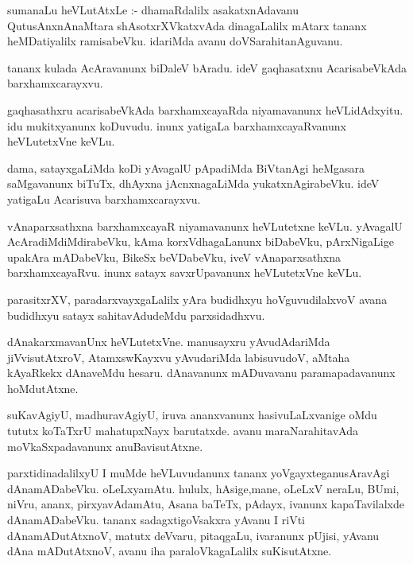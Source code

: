 \documentclass{article}
\begin{document}
\begin{mn}
sumanaLu heVLutAtxLe :- dhamaRdalilx asakatxnAdavanu QutusAnxnAnaMtara  
shAsotxrXVkatxvAda dinagaLalilx mAtarx tananx heMDatiyalilx ramisabeVku. 
idariMda avanu doVSarahitanAguvanu.
\end{mn}

\begin{mn}
tananx kulada AcAravanunx biDaleV bAradu. ideV gaqhasatxnu AcarisabeVkAda barxhamxcarayxvu.
\end{mn}

\begin{mn}
gaqhasathxru acarisabeVkAda barxhamxcayaRda niyamavanunx heVLidAdxyitu. idu
mukitxyanunx koDuvudu. inunx yatigaLa barxhamxcayaRvanunx heVLutetxVne keVLu.
\end{mn}

\begin{mn}
dama, satayxgaLiMda koDi yAvagalU pApadiMda BiVtanAgi heMgasara saMgavanunx 
biTuTx, dhAyxna jAcnxnagaLiMda yukatxnAgirabeVku. ideV yatigaLu Acarisuva barxhamxcarayxvu.
\end{mn}

\begin{mn}
vAnaparxsathxna barxhamxcayaR niyamavanunx  heVLutetxne keVLu. yAvagalU 
AcAradiMdiMdirabeVku, kAma korxVdhagaLanunx biDabeVku, pArxNigaLige upakAra 
mADabeVku, BikeSx beVDabeVku, iveV vAnaparxsathxna barxhamxcayaRvu. inunx 
satayx savxrUpavanunx heVLutetxVne keVLu.
\end{mn}

\begin{mn}
parasitxrXV, paradarxvayxgaLalilx yAra budidhxyu hoVguvudilalxvoV avana 
budidhxyu satayx sahitavAdudeMdu parxsidadhxvu.
\end{mn}

\begin{mn}
dAnakarxmavanUnx heVLutetxVne. manusayxru yAvudAdariMda jiVvisutAtxroV, 
AtamxswKayxvu yAvudariMda labisuvudoV, aMtaha  kAyaRkekx  dAnaveMdu  hesaru.  
dAnavanunx mADuvavanu paramapadavanunx hoMdutAtxne.
\end{mn}

\begin{mn}
suKavAgiyU, madhuravAgiyU, iruva ananxvanunx hasivuLaLxvanige oMdu tututx koTaTxrU 
mahatupxNayx barutatxde. avanu maraNarahitavAda moVkaSxpadavanunx anuBavisutAtxne.
\end{mn}

\begin{mn}
parxtidinadalilxyU I muMde heVLuvudanunx tananx yoVgayxteganusAravAgi dAnamADabeVku.
 oLeLxyamAtu. hululx, hAsige,mane, oLeLxV neraLu, BUmi, niVru, ananx, pirxyavAdamAtu,
 Asana baTeTx, pAdayx, ivanunx kapaTavilalxde dAnamADabeVku. tananx  sadagxtigoVsakxra 
 yAvanu  I riVti dAnamADutAtxnoV, matutx deVvaru, pitaqgaLu, ivaranunx pUjisi, yAvanu 
 dAna mADutAtxnoV, avanu iha paraloVkagaLalilx suKisutAtxne.
\end{mn}
\end{document}
